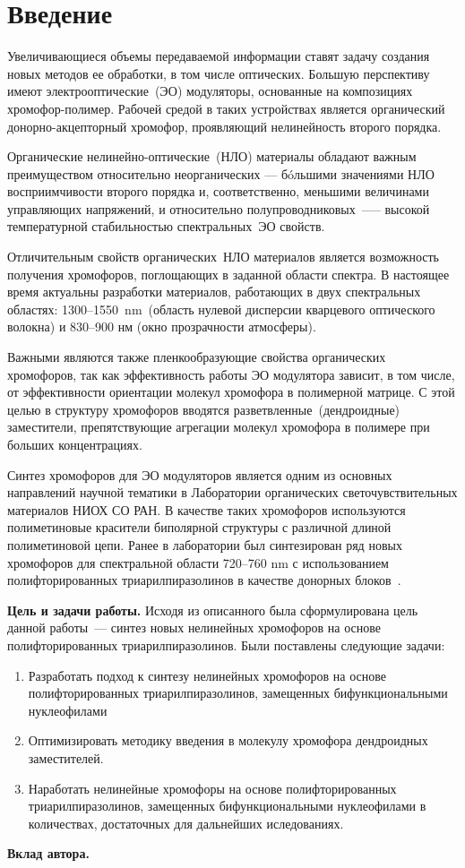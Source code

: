 \section{Введение}
Увеличивающиеся объемы передаваемой информации ставят задачу создания новых методов ее обработки, в том числе оптических. Большую перспективу имеют электрооптические~(ЭО) модуляторы, основанные на композициях хромофор-полимер. Рабочей средой в таких устройствах является органический донорно-акцепторный хромофор, проявляющий нелинейность второго порядка.

Органические нелинейно-оптические~(НЛО) материалы обладают важным преимуществом относительно неорганических — бóльшими значениями НЛО восприимчивости второго порядка и, соответственно, меньшими величинами управляющих напряжений, и относительно полупроводниковых~—-- высокой температурной стабильностью спектральных~ЭО свойств.

Отличительным свойств органических~НЛО материалов является возможность получения хромофоров, поглощающих в заданной области спектра. В настоящее время актуальны разработки материалов, работающих в двух спектральных областях: 1300--1550~\si{\nano\metre}~(область нулевой дисперсии кварцевого оптического волокна) и 830--900 нм (окно прозрачности атмосферы). 

Важными являются также пленкообразующие свойства органических хромофоров, так как эффективность работы ЭО модулятора зависит, в том числе, от эффективности ориентации молекул хромофора в полимерной матрице. С этой целью в структуру хромофоров вводятся разветвленные~(дендроидные) заместители, препятствующие агрегации молекул хромофора в полимере при больших концентрациях.

Синтез хромофоров для ЭО модуляторов является одним из основных направлений научной тематики в Лаборатории органических светочувствительных материалов НИОХ СО РАН. В качестве таких хромофоров используются полиметиновые красители биполярной структуры с различной длиной полиметиновой цепи. Ранее в лаборатории был синтезирован ряд новых хромофоров для спектральной области 720--760 \si{\nano\metre} с использованием полифторированных триарилпиразолинов в качестве донорных блоков~\cite{2019}.

\textbf{Цель и задачи работы.}
Исходя из описанного была сформулирована цель данной работы~--- синтез новых нелинейных хромофоров на основе полифторированных триарилпиразолинов.
Были поставлены следующие задачи:
\begin{enumerate}
    \item Разработать подход к синтезу нелинейных хромофоров на основе полифторированных триарилпиразолинов, замещенных бифункциональными нуклеофилами
    \item Оптимизировать методику введения в молекулу хромофора дендроидных заместителей.
    \item Наработать нелинейные хромофоры на основе полифторированных триарилпиразолинов, замещенных бифункциональными нуклеофилами в количествах, достаточных для дальнейших иследованиях.
\end{enumerate}

\textbf{Вклад автора.}
